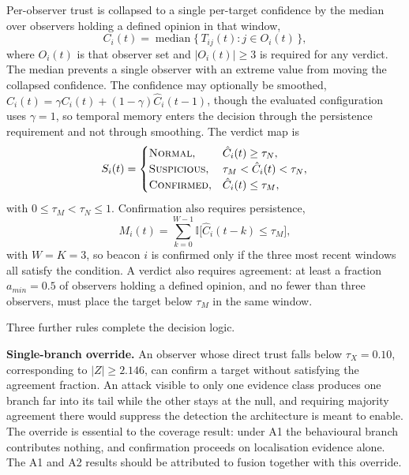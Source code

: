 Per-observer trust is collapsed to a single per-target confidence by the median
over observers holding a defined opinion in that window,
\begin{equation}
\label{eq:median}
C_i(t) = \operatorname{median}\{\, T_{ij}(t) : j \in O_i(t) \,\},
\end{equation}
where $O_i(t)$ is that observer set and $|O_i(t)| \ge 3$ is required for any
verdict. The median prevents a single observer with an extreme value from
moving the collapsed confidence. The confidence may optionally be smoothed,
$\hat C_i(t) = \gamma C_i(t) + (1-\gamma)\hat C_i(t-1)$, though the evaluated
configuration uses $\gamma = 1$, so temporal memory enters the decision through
the persistence requirement and not through smoothing. The verdict map is
\begin{equation}
\label{eq:verdict}
S_i(t) =
\begin{cases}
\textsc{Normal}, & \hat C_i(t) \ge \tau_N,\\
\textsc{Suspicious}, & \tau_M < \hat C_i(t) < \tau_N,\\
\textsc{Confirmed}, & \hat C_i(t) \le \tau_M,
\end{cases}
\end{equation}
with $0 \le \tau_M < \tau_N \le 1$. Confirmation also requires
persistence,
\begin{equation}
\label{eq:persist}
M_i(t) = \sum_{k=0}^{W-1} \mathbb{I}\bigl[\hat C_i(t-k) \le \tau_M\bigr],
\end{equation}
with $W = K = 3$, so beacon $i$ is confirmed only if the three most recent
windows all satisfy the condition. A verdict also requires agreement: at
least a fraction $a_{min} = 0.5$ of observers holding a defined opinion, and no
fewer than three observers, must place the target below $\tau_M$ in the same
window.

Three further rules complete the decision logic.

\textbf{Single-branch override.} An observer whose direct trust falls below
$\tau_X = 0.10$, corresponding to $|Z| \ge 2.146$, can confirm a target without
satisfying the agreement fraction. An attack visible to only one evidence class
produces one branch far into its tail while the other stays at the null, and
requiring majority agreement there would suppress the detection the
architecture is meant to enable. The override is essential to the coverage
result: under A1 the behavioural branch contributes nothing, and confirmation
proceeds on localisation evidence alone. The A1 and A2 results should be
attributed to fusion together with this override.

